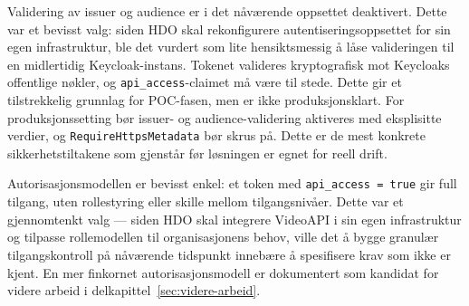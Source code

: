 Validering av issuer og audience er i det nåværende oppsettet deaktivert. Dette var et bevisst valg: siden HDO skal rekonfigurere autentiseringsoppsettet for sin egen infrastruktur, ble det vurdert som lite hensiktsmessig å låse valideringen til en midlertidig Keycloak-instans. Tokenet valideres kryptografisk mot Keycloaks offentlige nøkler, og \texttt{api\_access}-claimet må være til stede. Dette gir et tilstrekkelig grunnlag for POC-fasen, men er ikke produksjonsklart. For produksjonssetting bør issuer- og audience-validering aktiveres med eksplisitte verdier, og \texttt{RequireHttpsMetadata} bør skrus på. Dette er de mest konkrete sikkerhetstiltakene som gjenstår før løsningen er egnet for reell drift.


Autorisasjonsmodellen er bevisst enkel: et token med \texttt{api\_access = true} gir full tilgang, uten rollestyring eller skille mellom tilgangsnivåer. Dette var et gjennomtenkt valg — siden HDO skal integrere VideoAPI i sin egen infrastruktur og tilpasse rollemodellen til organisasjonens behov, ville det å bygge granulær tilgangskontroll på nåværende tidspunkt innebære å spesifisere krav som ikke er kjent. En mer finkornet autorisasjonsmodell er dokumentert som kandidat for videre arbeid i delkapittel~\ref{sec:videre-arbeid}.